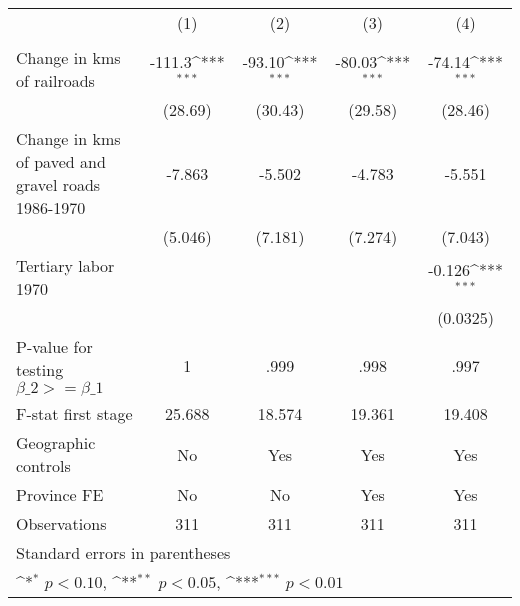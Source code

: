{
\def\sym#1{\ifmmode^{#1}\else\(^{#1}\)\fi}
\begin{tabular}{l*{4}{c}}
\hline\hline
                &\multicolumn{1}{c}{(1)}&\multicolumn{1}{c}{(2)}&\multicolumn{1}{c}{(3)}&\multicolumn{1}{c}{(4)}\\
                &\multicolumn{1}{c}{}&\multicolumn{1}{c}{}&\multicolumn{1}{c}{}&\multicolumn{1}{c}{}\\
\hline
Change in kms of railroads&   -111.3\sym{***}&   -93.10\sym{***}&   -80.03\sym{***}&   -74.14\sym{***}\\
                &  (28.69)         &  (30.43)         &  (29.58)         &  (28.46)         \\
[1em]
Change in kms of paved and gravel roads 1986-1970&   -7.863         &   -5.502         &   -4.783         &   -5.551         \\
                &  (5.046)         &  (7.181)         &  (7.274)         &  (7.043)         \\
[1em]
Tertiary labor 1970&                  &                  &                  &   -0.126\sym{***}\\
                &                  &                  &                  & (0.0325)         \\
\hline
P-value for testing $\beta\_{2} >= \beta\_{1}$&        1         &     .999         &     .998         &     .997         \\
F-stat first stage&   25.688         &   18.574         &   19.361         &   19.408         \\
Geographic controls&       No         &      Yes         &      Yes         &      Yes         \\
Province FE     &       No         &       No         &      Yes         &      Yes         \\
Observations    &      311         &      311         &      311         &      311         \\
\hline\hline
\multicolumn{5}{l}{\footnotesize Standard errors in parentheses}\\
\multicolumn{5}{l}{\footnotesize \sym{*} \(p<0.10\), \sym{**} \(p<0.05\), \sym{***} \(p<0.01\)}\\
\end{tabular}
}
